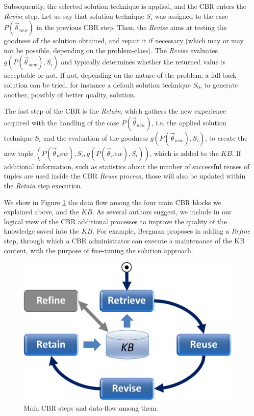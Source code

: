 \documentclass{IEEEtran}
\begin{document}
Subsequently, the selected solution technique is applied, and the CBR enters the {\em Revise} step. Let us say that solution technique $S_i$ was assigned to the  case  $P(\vec{\theta}_{new})$ in the previous CBR step. Then, the {\em Revise} aims at testing the goodness of the solution obtained, and repair it if necessary (which may or may not be possible, depending on the problem-class).  The {\em Revise} evaluates 
$g(P(\vec{\theta}_{new}),S_i)$ and typically determines whether the returned value is acceptable or not. If not, depending on the nature of the problem, a fall-back solution can be tried, for instance a default solution technique $S_0$, to generate another, possibly of better quality, solution.  

The last step of the CBR is the {\em Retain}, which gathers the new experience acquired with the handling of the case  $P(\vec{\theta}_{new})$, i.e. the applied solution technique $S_i$ and the evaluation of the  goodness $g(P(\vec{\theta}_{new}),S_i)$, to create the new tuple $ (P(\vec{\theta}_new),S_i,g(P(\vec{\theta}_new),S_i)) $, which is added to the $KB$. If additional information, such as statistics about the number of successful reuses of tuples are used inside the CBR {\em Reuse} process, those will also be updated within the {\em Retain} step execution. 

We show in Figure \ref{flow} the data flow among the four main CBR blocks we explained above, and the $KB$. As several authors suggest, we include in our logical view of the CBR additional processes to improve the quality of the knowledge saved into the $KB$. 
For example, Bergman proposes in \cite{Bergmann2001} adding a {\em Refine} step, through which a CBR administrator can execute a maintenance of the KB content, with the purpose of fine-tuning the solution approach. 

\begin{figure}[h!]
\centering
\includegraphics[scale=0.18]{CBR.pdf}
\caption{Main CBR steps and data-flow among them.}
\label{flow}
\end{figure}
\end{document}
